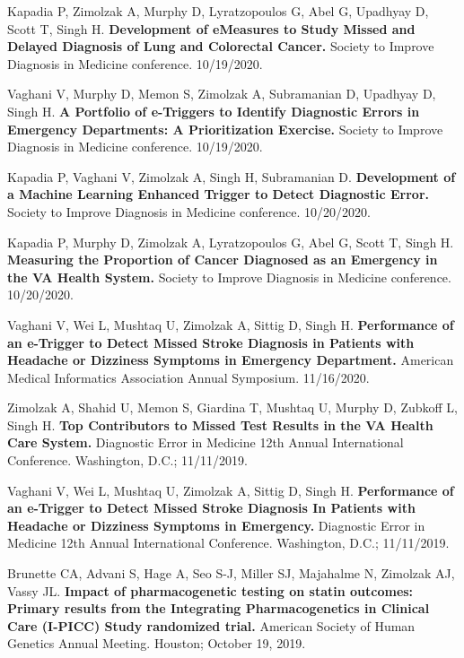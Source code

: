 \documentclass[10pt]{article}
\begin{document}

Kapadia P, Zimolzak A, Murphy D, Lyratzopoulos G, Abel G, Upadhyay D,
Scott T, Singh H. \textbf{Development of eMeasures to Study Missed and
  Delayed Diagnosis of Lung and Colorectal Cancer.} Society to Improve
Diagnosis in Medicine conference. 10/19/2020.

Vaghani V, Murphy D, Memon S, Zimolzak A, Subramanian D, Upadhyay D,
Singh H. \textbf{A Portfolio of e-Triggers to Identify Diagnostic
  Errors in Emergency Departments: A Prioritization Exercise.} Society
to Improve Diagnosis in Medicine conference. 10/19/2020.

Kapadia P, Vaghani V, Zimolzak A, Singh H, Subramanian D.
\textbf{Development of a Machine Learning Enhanced Trigger to Detect
  Diagnostic Error.} Society to Improve Diagnosis in Medicine
conference. 10/20/2020.

Kapadia P, Murphy D, Zimolzak A, Lyratzopoulos G, Abel G, Scott T,
Singh H. \textbf{Measuring the Proportion of Cancer Diagnosed as an
  Emergency in the VA Health System.} Society to Improve Diagnosis in
Medicine conference. 10/20/2020.


Vaghani V, Wei L, Mushtaq U, Zimolzak A, Sittig D, Singh H.
\textbf{Performance of an e-Trigger to Detect Missed Stroke Diagnosis
  in Patients with Headache or Dizziness Symptoms in Emergency
  Department.} American Medical Informatics
Association Annual Symposium. 11/16/2020.


Zimolzak A, Shahid U, Memon S, Giardina T, Mushtaq U, Murphy D,
Zubkoff L, Singh H. \textbf{Top Contributors to Missed Test Results in
  the VA Health Care System.} Diagnostic Error in Medicine 12th Annual
International Conference. Washington, D.C.; 11/11/2019.

Vaghani V, Wei L, Mushtaq U, Zimolzak A, Sittig D, Singh H.
\textbf{Performance of an e-Trigger to Detect Missed Stroke Diagnosis
  In Patients with Headache or Dizziness Symptoms in Emergency.}
Diagnostic Error in Medicine 12th Annual International Conference.
Washington, D.C.; 11/11/2019.

Brunette CA, Advani S, Hage A, Seo S-J, Miller SJ, Majahalme N,
Zimolzak AJ, Vassy JL. \textbf{Impact of pharmacogenetic testing on
  statin outcomes: Primary results from the Integrating
  Pharmacogenetics in Clinical Care (I-PICC) Study randomized trial.}
American Society of Human Genetics Annual Meeting. Houston; October
19, 2019.
\end{document}
